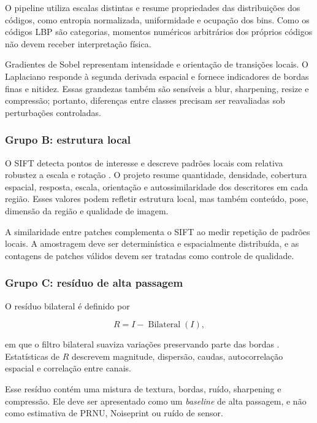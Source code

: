 \documentclass[11pt,a4paper]{article}
\begin{document}
O pipeline utiliza escalas distintas e resume propriedades das distribuições
dos códigos, como entropia normalizada, uniformidade e ocupação dos bins. Como
os códigos LBP são categorias, momentos numéricos arbitrários dos próprios
códigos não devem receber interpretação física.

Gradientes de Sobel representam intensidade e orientação de transições locais.
O Laplaciano responde à segunda derivada espacial e fornece indicadores de
bordas finas e nitidez. Essas grandezas também são sensíveis a blur,
sharpening, resize e compressão; portanto, diferenças entre classes precisam
ser reavaliadas sob perturbações controladas.

\subsubsection{Grupo B: estrutura local}

O SIFT detecta pontos de interesse e descreve padrões locais com relativa
robustez a escala e rotação \cite{lowe2004sift}. O projeto resume quantidade,
densidade, cobertura espacial, resposta, escala, orientação e autossimilaridade
dos descritores em cada região. Esses valores podem refletir estrutura local,
mas também conteúdo, pose, dimensão da região e qualidade de imagem.

A similaridade entre patches complementa o SIFT ao medir repetição de padrões
locais. A amostragem deve ser determinística e espacialmente distribuída, e as
contagens de patches válidos devem ser tratadas como controle de qualidade.

\subsubsection{Grupo C: resíduo de alta passagem}

O resíduo bilateral é definido por

\begin{equation}
  R = I - \operatorname{Bilateral}(I),
\end{equation}

em que o filtro bilateral suaviza variações preservando parte das bordas
\cite{tomasi1998bilateral}. Estatísticas de $R$ descrevem magnitude, dispersão,
caudas, autocorrelação espacial e correlação entre canais.

Esse resíduo contém uma mistura de textura, bordas, ruído, sharpening e
compressão. Ele deve ser apresentado como um \emph{baseline} de alta passagem,
e não como estimativa de PRNU, Noiseprint ou ruído de sensor.
\end{document}
